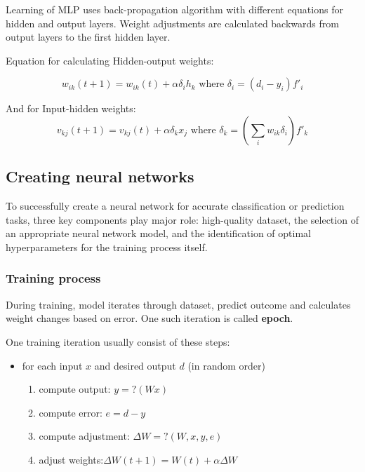 Learning of MLP uses back-propagation algorithm with different equations for hidden and output layers. Weight adjustments are calculated backwards from output layers to the first hidden layer.\cite{NNFarkas}

Equation for calculating Hidden-output weights:

\begin{equation}
\label{learn3}
w_{ik}(t+1) = w_{ik}(t) + \alpha\delta_ih_k\text{ where }\delta_i = (d_i-y_i)f'_i
\end{equation}

And for Input-hidden weights:
\begin{equation}
\label{learn4}
v_{kj}(t+1) = v_{kj}(t) + \alpha\delta_kx_j\text{ where }\delta_k = (\sum_iw_{ik}\delta_i)f'_k
\end{equation}

\subsection{Creating neural networks}

To successfully create a neural network for accurate classification or prediction tasks, three key components play major role: high-quality dataset, the selection of an appropriate neural network model, and the identification of optimal hyperparameters for the training process itself.

\subsubsection{Training process}

During training, model iterates through dataset, predict outcome and calculates weight changes based on error. One such iteration is called \textbf{epoch}.

One training iteration usually consist of these steps:
\begin{itemize}
  \item for each input $x$ and desired output $d$ (in random order)
  \begin{enumerate}
    \item compute output: $y=?(Wx)$
    \item compute error: $e=d-y$
    \item compute adjustment: $\Delta W =?(W,x,y,e)$
    \item adjust weights:$\Delta W(t+1)=W(t)+\alpha\Delta W$
  \end{enumerate}
\end{itemize}

